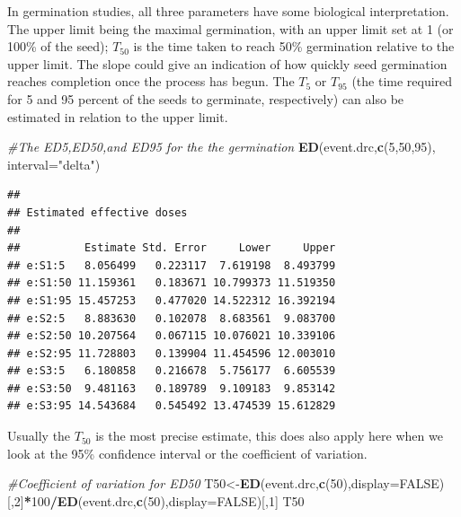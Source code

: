 \documentclass[letterpaper,]{book}
\newenvironment{Shaded}{\begin{snugshade}}{\end{snugshade}}
\newcommand{\CommentTok}[1]{\textcolor[rgb]{0.56,0.35,0.01}{\textit{#1}}}
\newcommand{\DataTypeTok}[1]{\textcolor[rgb]{0.13,0.29,0.53}{#1}}
\newcommand{\DecValTok}[1]{\textcolor[rgb]{0.00,0.00,0.81}{#1}}
\newcommand{\KeywordTok}[1]{\textcolor[rgb]{0.13,0.29,0.53}{\textbf{#1}}}
\newcommand{\NormalTok}[1]{#1}
\newcommand{\OperatorTok}[1]{\textcolor[rgb]{0.81,0.36,0.00}{\textbf{#1}}}
\newcommand{\OtherTok}[1]{\textcolor[rgb]{0.56,0.35,0.01}{#1}}
\newcommand{\StringTok}[1]{\textcolor[rgb]{0.31,0.60,0.02}{#1}}
\begin{document}
In germination studies, all three parameters have some biological interpretation. The upper limit being the maximal germination, with an upper limit set at 1 (or 100\% of the seed); \(T_{50}\) is the time taken to reach 50\% germination relative to the upper limit. The slope could give an indication of how quickly seed germination reaches completion once the process has begun. The \(T_{5}\) or \(T_{95}\) (the time required for 5 and 95 percent of the seeds to germinate, respectively) can also be estimated in relation to the upper limit.

\begin{Shaded}
\begin{Highlighting}[]
\CommentTok{#The ED5,ED50,and ED95 for the the germination}
\KeywordTok{ED}\NormalTok{(event.drc,}\KeywordTok{c}\NormalTok{(}\DecValTok{5}\NormalTok{,}\DecValTok{50}\NormalTok{,}\DecValTok{95}\NormalTok{), }\DataTypeTok{interval=}\StringTok{"delta"}\NormalTok{)}
\end{Highlighting}
\end{Shaded}

\begin{verbatim}
## 
## Estimated effective doses
## 
##          Estimate Std. Error     Lower     Upper
## e:S1:5   8.056499   0.223117  7.619198  8.493799
## e:S1:50 11.159361   0.183671 10.799373 11.519350
## e:S1:95 15.457253   0.477020 14.522312 16.392194
## e:S2:5   8.883630   0.102078  8.683561  9.083700
## e:S2:50 10.207564   0.067115 10.076021 10.339106
## e:S2:95 11.728803   0.139904 11.454596 12.003010
## e:S3:5   6.180858   0.216678  5.756177  6.605539
## e:S3:50  9.481163   0.189789  9.109183  9.853142
## e:S3:95 14.543684   0.545492 13.474539 15.612829
\end{verbatim}

Usually the \(T_{50}\) is the most precise estimate, this does also apply here when we look at the 95\% confidence interval or the coefficient of variation.

\begin{Shaded}
\begin{Highlighting}[]
\CommentTok{#Coefficient of variation for ED50}
\NormalTok{T50<-}\KeywordTok{ED}\NormalTok{(event.drc,}\KeywordTok{c}\NormalTok{(}\DecValTok{50}\NormalTok{),}\DataTypeTok{display=}\OtherTok{FALSE}\NormalTok{)[,}\DecValTok{2}\NormalTok{]}\OperatorTok{*}\DecValTok{100}\OperatorTok{/}\KeywordTok{ED}\NormalTok{(event.drc,}\KeywordTok{c}\NormalTok{(}\DecValTok{50}\NormalTok{),}\DataTypeTok{display=}\OtherTok{FALSE}\NormalTok{)[,}\DecValTok{1}\NormalTok{]}
\NormalTok{T50}
\end{Highlighting}
\end{Shaded}
\end{document}
